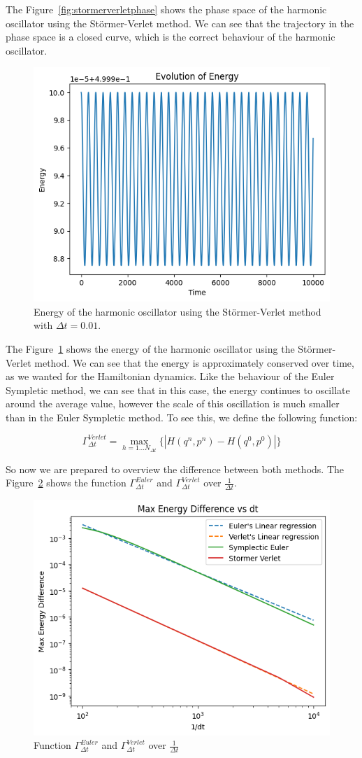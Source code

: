 \documentclass{report}
\begin{document}
The Figure~\ref{fig:stormerverletphase} shows the phase space of the harmonic oscillator using the Störmer-Verlet method. We can see that the trajectory in the phase space is a closed curve, which is the correct behaviour of the harmonic oscillator.

\begin{figure}[H]
	\centering
	\includegraphics[width=0.5\linewidth]{./Figures/Sympletic/verletenergy.png}
	\caption{Energy of the harmonic oscillator using the Störmer-Verlet method with \(\Delta t = 0.01\).}
	\label{fig:stormerverletenergy}
\end{figure}

The Figure~\ref{fig:stormerverletenergy} shows the energy of the harmonic oscillator using the Störmer-Verlet method. We can see that the energy is approximately conserved over time, as we wanted for the Hamiltonian dynamics. Like the behaviour of the Euler Sympletic method, we can see that in this case, the energy continues to oscillate around the average value, however the scale of this oscillation is much smaller than in the Euler Sympletic method. To see this, we define the following function:

\[
	\Gamma_{\Delta t}^{Verlet} = \max_{h = 1 ... N_{\Delta t}}\{|H(q^n, p^n) - H(q^0, p^0)|\}
\]

So now we are prepared to overview the difference between both methods. The Figure~\ref*{fig:comparisonmaxenergy} shows the function \(\Gamma_{\Delta t}^{Euler}\) and \(\Gamma_{\Delta t}^{Verlet}\) over \(\frac{1}{\Delta t}\).

\begin{figure}[H]
	\centering
	\includegraphics[width=0.5\linewidth]{./Figures/Sympletic/maxenergydifference.png}
	\caption{Function \(\Gamma_{\Delta t}^{Euler}\) and \(\Gamma_{\Delta t}^{Verlet}\) over \(\frac{1}{\Delta t}\)}
	\label{fig:comparisonmaxenergy}
\end{figure}
\end{document}
